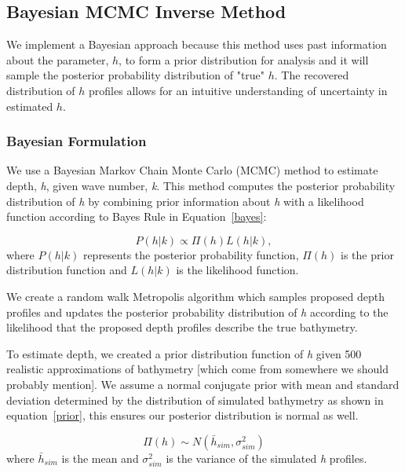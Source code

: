 \subsection{Bayesian MCMC Inverse Method}
We implement a Bayesian approach because this method uses past information about the parameter, $h$, to form a prior distribution for analysis and it will sample the posterior probability distribution of "true" $h$. The recovered distribution of $h$ profiles allows for an intuitive understanding of uncertainty in estimated $h$.

\subsubsection{Bayesian Formulation}

We use a Bayesian Markov Chain Monte Carlo (MCMC) method to estimate depth, \textit{h}, given wave number, \textit{k}. %
This method computes the posterior probability distribution of \textit{h} by combining prior information about \textit{h} with a likelihood function according to Bayes Rule in Equation~\ref{bayes}: 


\begin{equation}\label{bayes}
P(h|%
k) \propto \Pi(h)L(h|%
k),
\end{equation} 
where $P(h|%
k)$ represents the posterior probability function, $\Pi(h)$ is the prior distribution function and $L(h|%
k)$ is the likelihood function.

We create a random walk Metropolis algorithm \citep{Metropolis1953} which samples proposed depth profiles and updates the posterior probability distribution of \textit{h} according to the likelihood that the proposed depth profiles describe the true bathymetry. 

To estimate depth, we created a prior distribution function of \textit{h} given 500 realistic approximations of bathymetry [which come from somewhere we should probably mention].  We assume a normal conjugate prior with mean and standard deviation determined by the distribution of simulated bathymetry as shown in equation~\ref{prior}, this ensures our posterior distribution is normal as well. 

\begin{equation}\label{prior}
\Pi(h) \sim N(\bar{h}_{sim},\sigma_{sim}^2)
\end{equation}
where $\bar{h}_{sim}$ is the mean and $\sigma_{sim}^2$ is the variance of the simulated \textit{h} profiles. 

